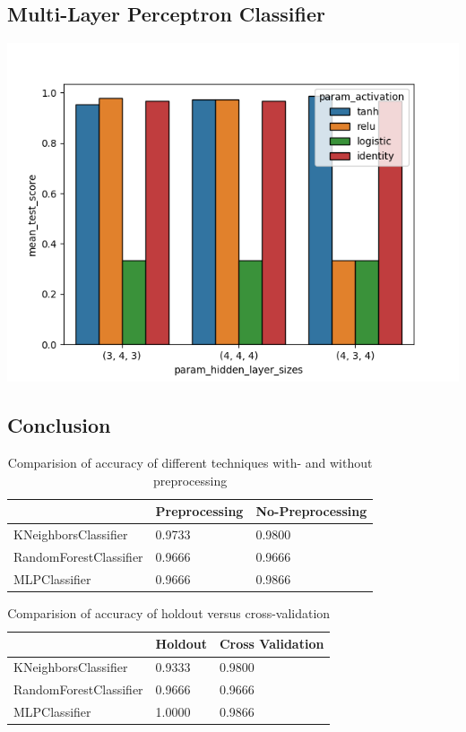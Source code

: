 \documentclass{article}
\begin{document}
\subsection{Multi-Layer Perceptron Classifier}
\includegraphics[width=\textwidth]{plots/mlp_np_comparision.png}

\subsection{Conclusion}

\begin{table}[h]
\begin{center}
\begin{tabular}{|l|l|l|}
\hline
                       & Preprocessing & No-Preprocessing \\ \hline
KNeighborsClassifier   & 0.9733        & 0.9800           \\ \hline
RandomForestClassifier & 0.9666        & 0.9666           \\ \hline
MLPClassifier          & 0.9666        & 0.9866           \\ \hline
\end{tabular}
\caption{Comparision of accuracy of different techniques with- and without preprocessing}
\end{center}
\end{table}

\begin{table}[h]
\begin{center}
\begin{tabular}{|l|l|l|}
\hline
                       & Holdout & Cross Validation \\ \hline
KNeighborsClassifier   & 0.9333  & 0.9800           \\ \hline
RandomForestClassifier & 0.9666  & 0.9666           \\ \hline
MLPClassifier          & 1.0000  & 0.9866           \\ \hline
\end{tabular}
\caption{Comparision of accuracy of holdout versus cross-validation}
\end{center}
\end{table}
\end{document}
